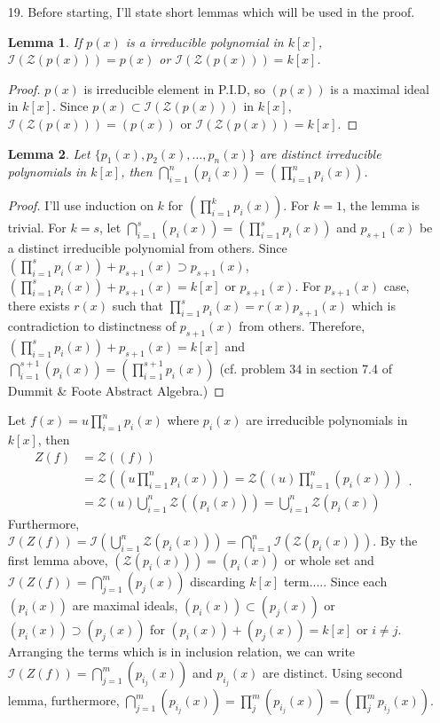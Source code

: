\documentclass[12pt]{article}
\newcommand{\I}{\mathcal{I}}
\newcommand{\Z}{\mathcal{Z}}
\newtheorem{lemma}{Lemma}
\begin{document}
\begin{enumerate}
\begin{enumerate}
\end{enumerate}
\item[19.] Before starting, I'll state short lemmas which will be used in the proof.
\begin{lemma}
If $p(x)$ is a irreducible polynomial in $k[x]$, $\I(\Z(p(x)))=p(x)$ or $\I(\Z(p(x)))=k[x]$.
\end{lemma}
\begin{proof}
$p(x)$ is irreducible element in P.I.D, so $(p(x))$ is a maximal ideal in $k[x]$. Since $p(x)\subset \I(\Z(p(x)))$ in $k[x]$, $\I(\Z(p(x)))=(p(x))$ or $\I(\Z(p(x)))=k[x]$.
\end{proof}
\begin{lemma}
Let $\{p_1(x), p_2(x),\ldots,p_n(x)\}$ are distinct irreducible polynomials in $k[x]$, then $\bigcap_{i=1}^n (p_i(x))=\left(\prod_{i=1}^n p_i(x)\right)$.
\end{lemma}
\begin{proof}
I'll use induction on $k$ for $\left(\prod_{i=1}^k p_i(x)\right)$. For $k=1$, the lemma is trivial. For $k=s$, let $\bigcap_{i=1}^s (p_i(x))=\left(\prod_{i=1}^s p_i(x)\right)$ and $p_{s+1}(x)$ be a distinct irreducible polynomial from others. Since $\left(\prod_{i=1}^s p_i(x)\right)+p_{s+1}(x)\supset p_{s+1}(x)$, $\left(\prod_{i=1}^s p_i(x)\right)+p_{s+1}(x)=k[x]$ or $p_{s+1}(x)$. For $p_{s+1}(x)$ case, there exists $r(x)$ such that $\prod_{i=1}^s p_i(x)=r(x)p_{s+1}(x)$ which is contradiction to distinctness of $p_{s+1}(x)$ from others. Therefore, $\left(\prod_{i=1}^s p_i(x)\right)+p_{s+1}(x)=k[x]$ and $\bigcap_{i=1}^{s+1} (p_i(x))=\left(\prod_{i=1}^{s+1} p_i(x)\right)$ (cf. problem 34 in section 7.4 of Dummit \& Foote Abstract Algebra.)
\end{proof}
Let $f(x)=u\prod_{i=1}^n p_i(x)$ where $p_i(x)$ are irreducible polynomials in $k[x]$, then 
\begin{equation*}
\begin{split}
Z(f)&=\Z((f)) \\
&=\Z\left(\left(u\prod_{i=1}^n p_i(x)\right)\right) =\Z\left((u)\prod_{i=1}^n(p_i(x))\right) \\
&=\Z(u)\bigcup_{i=1}^n \Z((p_i(x))) =\bigcup_{i=1}^n \Z(p_i(x))
\end{split}.
\end{equation*}
Furthermore,  $\I\left(Z(f)\right)=\I\left(\bigcup_{i=1}^n \Z(p_i(x))\right)=\bigcap_{i=1}^n \I\left(\Z(p_i(x))\right)$. By the first lemma above, $\left(\Z(p_i(x))\right)=(p_i(x))$ or whole set and $\I\left(Z(f)\right)=\bigcap_{j=1}^m (p_{j}(x))$ discarding $k[x]$ term..... Since each $(p_i(x))$ are maximal ideals, $(p_i(x))\subset (p_j(x))$ or $(p_i(x))\supset (p_j(x))$ for $(p_i(x))+ (p_j(x))=k[x]$ or $i\neq j$. Arranging the terms which is in inclusion relation, we can write $\I\left(Z(f)\right)=\bigcap_{j=1}^m (p_{i_j}(x))$ and $p_{i_j}(x)$ are distinct. Using second lemma, furthermore, $\bigcap_{j=1}^m (p_{i_j}(x))=\prod_j^m(p_{i_j}(x))=(\prod_j^m p_{i_j}(x))$.


\end{enumerate}
\end{document}
